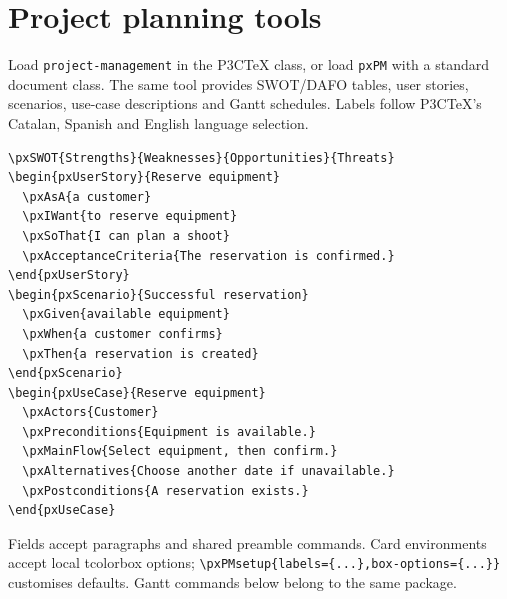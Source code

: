 \documentclass[a4paper]{article}
\begin{document}
\section{Project planning tools}
Load \texttt{project-management} in the P3CTeX class, or load \texttt{pxPM}
with a standard document class. The same tool provides SWOT/DAFO tables,
user stories, scenarios, use-case descriptions and Gantt schedules.
Labels follow P3CTeX's Catalan, Spanish and English language selection.
\begin{verbatim}
\pxSWOT{Strengths}{Weaknesses}{Opportunities}{Threats}
\begin{pxUserStory}{Reserve equipment}
  \pxAsA{a customer}
  \pxIWant{to reserve equipment}
  \pxSoThat{I can plan a shoot}
  \pxAcceptanceCriteria{The reservation is confirmed.}
\end{pxUserStory}
\begin{pxScenario}{Successful reservation}
  \pxGiven{available equipment}
  \pxWhen{a customer confirms}
  \pxThen{a reservation is created}
\end{pxScenario}
\begin{pxUseCase}{Reserve equipment}
  \pxActors{Customer}
  \pxPreconditions{Equipment is available.}
  \pxMainFlow{Select equipment, then confirm.}
  \pxAlternatives{Choose another date if unavailable.}
  \pxPostconditions{A reservation exists.}
\end{pxUseCase}
\end{verbatim}
Fields accept paragraphs and shared preamble commands. Card environments accept
local tcolorbox options; \verb|\pxPMsetup{labels={...},box-options={...}}|
customises defaults. Gantt commands below belong to the same package.
\end{document}
